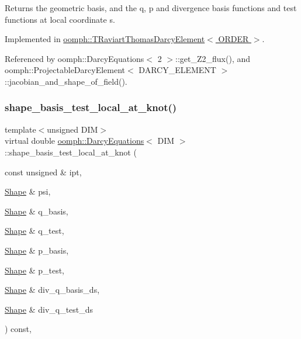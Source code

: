 Returns the geometric basis, and the q, p and divergence basis functions and test functions at local coordinate s. 



Implemented in \hyperlink{classoomph_1_1TRaviartThomasDarcyElement_abf52dcfe30546dd3e2617c1253580dfc}{oomph\+::\+T\+Raviart\+Thomas\+Darcy\+Element$<$ O\+R\+D\+E\+R $>$}.



Referenced by oomph\+::\+Darcy\+Equations$<$ 2 $>$\+::get\+\_\+\+Z2\+\_\+flux(), and oomph\+::\+Projectable\+Darcy\+Element$<$ D\+A\+R\+C\+Y\+\_\+\+E\+L\+E\+M\+E\+N\+T $>$\+::jacobian\+\_\+and\+\_\+shape\+\_\+of\+\_\+field().

\mbox{\label{classoomph_1_1DarcyEquations_a43dc36e25fe5eed15066f50e4122c42b}} 
\subsubsection{\texorpdfstring{shape\+\_\+basis\+\_\+test\+\_\+local\+\_\+at\+\_\+knot()}{shape\_basis\_test\_local\_at\_knot()}}
{\footnotesize\ttfamily template$<$unsigned D\+IM$>$ \\
virtual double \hyperlink{classoomph_1_1DarcyEquations}{oomph\+::\+Darcy\+Equations}$<$ D\+IM $>$\+::shape\+\_\+basis\+\_\+test\+\_\+local\+\_\+at\+\_\+knot (\begin{DoxyParamCaption}\item[{const unsigned \&}]{ipt,  }\item[{\hyperlink{classoomph_1_1Shape}{Shape} \&}]{psi,  }\item[{\hyperlink{classoomph_1_1Shape}{Shape} \&}]{q\+\_\+basis,  }\item[{\hyperlink{classoomph_1_1Shape}{Shape} \&}]{q\+\_\+test,  }\item[{\hyperlink{classoomph_1_1Shape}{Shape} \&}]{p\+\_\+basis,  }\item[{\hyperlink{classoomph_1_1Shape}{Shape} \&}]{p\+\_\+test,  }\item[{\hyperlink{classoomph_1_1Shape}{Shape} \&}]{div\+\_\+q\+\_\+basis\+\_\+ds,  }\item[{\hyperlink{classoomph_1_1Shape}{Shape} \&}]{div\+\_\+q\+\_\+test\+\_\+ds }\end{DoxyParamCaption}) const\hspace{0.3cm}{\ttfamily [protected]}, {}}



